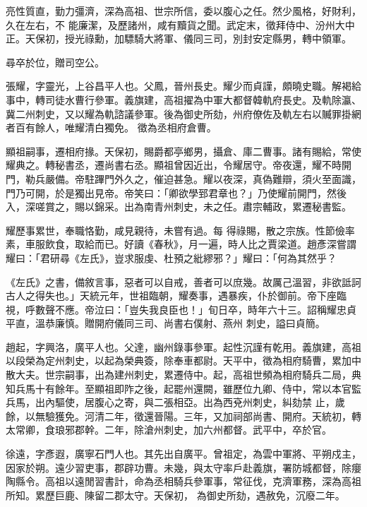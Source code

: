 \begin{pinyinscope}
 亮性質直，勤力彊濟，深為高祖、世宗所信，委以腹心之任。然少風格，好財利，久在左右，不
 能廉潔，及歷諸州，咸有黷貨之聞。武定末，徵拜侍中、汾州大中正。天保初，授光祿勳，加驃騎大將軍、儀同三司，別封安定縣男，轉中領軍。



 尋卒於位，贈司空公。



 張耀，字靈光，上谷昌平人也。父鳳，晉州長史。耀少而貞謹，頗曉史職。解褐給事中，轉司徒水曹行參軍。義旗建，高祖擢為中軍大都督韓軌府長史。及軌除瀛、冀二州刺史，又以耀為軌諮議參軍。後為御史所劾，州府僚佐及軌左右以贓罪掛網者百有餘人，唯耀清白獨免。
 徵為丞相府倉曹。



 顯祖嗣事，遷相府掾。天保初，賜爵都亭鄉男，攝倉、庫二曹事。諸有賜給，常使耀典之。轉秘書丞，遷尚書右丞。顯祖曾因近出，令耀居守。帝夜還，耀不時開門，勒兵嚴備。帝駐蹕門外久之，催迫甚急。耀以夜深，真偽難辯，須火至面識，門乃可開，於是獨出見帝。帝笑曰：「卿欲學郅君章也？」乃使耀前開門，然後入，深嗟賞之，賜以錦采。出為南青州刺史，未之任。肅宗輔政，累遷秘書監。



 耀歷事累世，奉職恪勤，咸見親待，未嘗有過。每
 得祿賜，散之宗族。性節儉率素，車服飲食，取給而已。好讀《春秋》，月一遍，時人比之賈梁道。趙彥深嘗謂耀曰：「君研尋《左氏》，豈求服虔、杜預之紕繆邪？」耀曰：「何為其然乎？



 《左氏》之書，備敘言事，惡者可以自戒，善者可以庶幾。故厲己溫習，非欲詆訶古人之得失也。」天統元年，世祖臨朝，耀奏事，遇暴疾，仆於御前。帝下座臨視，呼數聲不應。帝泣曰：「豈失我良臣也！」旬日卒，時年六十三。詔稱耀忠貞平直，溫恭廉慎。贈開府儀同三司、尚書右僕射、燕州
 刺史，謚曰貞簡。



 趙起，字興洛，廣平人也。父達，幽州錄事參軍。起性沉謹有乾用。義旗建，高祖以段榮為定州刺史，以起為榮典簽，除奉車都尉。天平中，徵為相府騎曹，累加中散大夫。世宗嗣事，出為建州刺史，累遷侍中。起，高祖世頻為相府騎兵二局，典知兵馬十有餘年。至顯祖即阼之後，起罷州還闕，雖歷位九卿、侍中，常以本官監兵馬，出內驅使，居腹心之寄，與二張相亞。出為西兗州刺史，糾劾禁
 止，歲餘，以無驗獲免。河清二年，徵還晉陽。三年，又加祠部尚書、開府。天統初，轉太常卿，食琅邪郡幹。二年，除滄州刺史，加六州都督。武平中，卒於官。



 徐遠，字彥遐，廣寧石門人也。其先出自廣平。曾祖定，為雲中軍將、平朔戍主，因家於朔。遠少習吏事，郡辟功曹。未幾，與太守率戶赴義旗，署防城都督，除癭陶縣令。高祖以遠閒習書計，命為丞相騎兵參軍事，常征伐，克濟軍務，深為高祖所知。累歷巨鹿、陳留二郡太守。天保初，
 為御史所劾，遇赦免，沉廢二年。




\end{pinyinscope}
